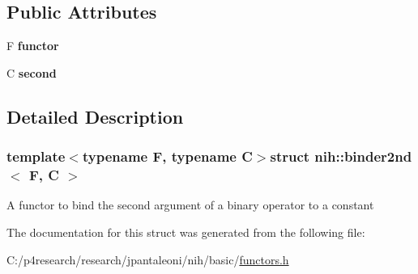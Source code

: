 \subsection*{\-Public \-Attributes}
\begin{DoxyCompactItemize}
\item 
\hypertarget{structnih_1_1binder2nd_a941c6409f76a9f54ae48279431062494}{
\-F {\bfseries functor}}
\label{structnih_1_1binder2nd_a941c6409f76a9f54ae48279431062494}

\item 
\hypertarget{structnih_1_1binder2nd_a3df9e60c01e37c9e8e3a7d6eb35395df}{
\-C {\bfseries second}}
\label{structnih_1_1binder2nd_a3df9e60c01e37c9e8e3a7d6eb35395df}

\end{DoxyCompactItemize}


\subsection{\-Detailed \-Description}
\subsubsection*{template$<$typename F, typename C$>$struct nih\-::binder2nd$<$ F, C $>$}

\-A functor to bind the second argument of a binary operator to a constant 

\-The documentation for this struct was generated from the following file\-:\begin{DoxyCompactItemize}
\item 
\-C\-:/p4research/research/jpantaleoni/nih/basic/\hyperlink{functors_8h}{functors.\-h}\end{DoxyCompactItemize}
